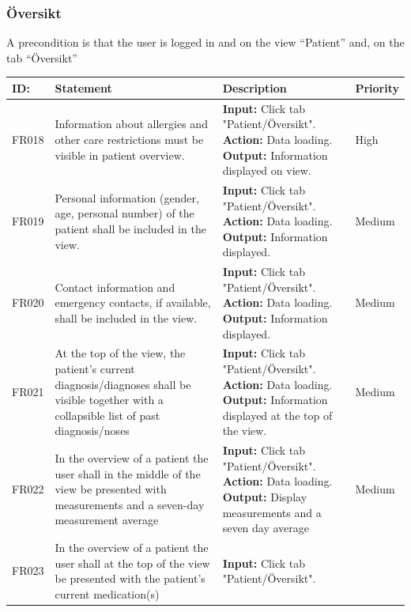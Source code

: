 \documentclass{scrreprt}
\begin{document}
\subsubsection{Översikt}
A precondition is that the user is logged in and on the view “Patient” and, on the tab “Översikt”
\begin{center}
\begin{tabularx}{\linewidth}{| l | X | X | l |}
\hline
\textbf{ID:} & \textbf{Statement} & \textbf{Description} & \textbf{Priority} \\ 
\hline
FR018 & Information about allergies and other care restrictions must be visible in patient overview. & \textbf{Input:} Click tab "Patient/Översikt".
\newline \textbf{Action:} Data loading.
\newline \textbf{Output:} Information displayed on view. & High \\ 
\hline
FR019 & Personal information (gender, age, personal number) of the patient shall be included in the view. & \textbf{Input:} Click tab "Patient/Översikt".
\newline \textbf{Action:} Data loading.
\newline \textbf{Output:} Information displayed. & Medium \\ 
\hline
FR020 & Contact information and emergency contacts, if available, shall be included in the view. & \textbf{Input:} Click tab "Patient/Översikt".
\newline \textbf{Action:} Data loading.
\newline \textbf{Output:} Information displayed. & Medium \\ 
\hline
FR021 & At the top of the view, the patient's current diagnosis/diagnoses shall be visible together with a collapsible list of past diagnosis/noses & \textbf{Input:} Click tab "Patient/Översikt".
\newline \textbf{Action:} Data loading.
\newline \textbf{Output:} Information displayed at the top of the view. & Medium \\ 
\hline
FR022 & In the overview of a patient the user shall in the middle of the view be presented with measurements and a seven-day measurement average & \textbf{Input:} Click tab "Patient/Översikt".
\newline \textbf{Action:} Data loading.
\newline \textbf{Output:} Display measurements and a seven day average & Medium \\ 
\hline
FR023 & In the overview of a patient the user shall at the top of the view be presented with the patient’s current medication(s) & \textbf{Input:} Click tab "Patient/Översikt".

\end{tabularx}
\end{center}
\end{document}

